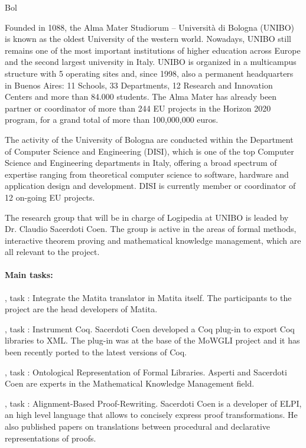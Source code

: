\begin{sitedescription}{Bol}


Founded in 1088, the Alma Mater Studiorum – Università di Bologna (UNIBO) is known as the oldest University of the western world. Nowadays, UNIBO still remains one of the most important institutions of higher education across Europe and the second largest university in Italy. UNIBO is organized in a multicampus structure with 5 operating sites and, since 1998, also a permanent headquarters in Buenos Aires: 11 Schools, 33 Departments, 12 Research and Innovation Centers and more than 84.000 students. The Alma Mater has already been partner or coordinator of more than 244 EU projects in the Horizon 2020 program, for a grand total of more than 100,000,000 euros.

The activity of the University of Bologna are conducted within the Department of Computer Science and Engineering (DISI), which is one of the top Computer Science and Engineering departments in Italy, offering a broad spectrum of expertise ranging from theoretical computer science to software, hardware and application design and development. DISI is currently member or coordinator of 12 on-going EU projects.

The research group that will be in charge of Logipedia at UNIBO is leaded by Dr. Claudio Sacerdoti Coen. The group is active in the areas of formal methods, interactive theorem proving and mathematical knowledge management, which are all relevant to the project.

\paragraph*{Main tasks:}

\begin{compactitem}
\item {}, task : Integrate the Matita translator in Matita itself. The participants to the project are the head developers of Matita.
\item {}, task : Instrument Coq. Sacerdoti Coen developed a Coq plug-in to export Coq libraries to XML. The plug-in was at the base of the MoWGLI project and it has been recently ported to the latest versions of Coq.
\item {}, task : Ontological Representation of Formal Libraries. Asperti and Sacerdoti Coen are experts in the Mathematical Knowledge Management field.
\item {}, task : Alignment-Based  Proof-Rewriting. Sacerdoti Coen is a developer of ELPI, an high level language that allows to concisely express proof transformations. He also published papers on translations between procedural and declarative representations of proofs. 
\end{compactitem}


\end{sitedescription}
